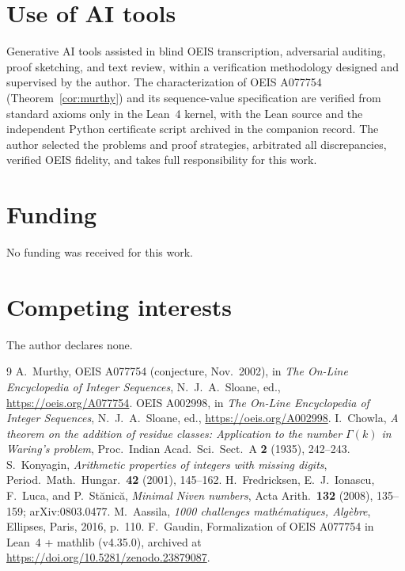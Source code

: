 \documentclass[11pt]{article}
\theoremstyle{remark}
\begin{document}
\section*{Use of AI tools}
Generative AI tools assisted in blind OEIS transcription,
adversarial auditing, proof sketching, and text review,
within a verification methodology designed and supervised
by the author. The characterization of OEIS A077754
(Theorem~\ref{cor:murthy}) and its sequence-value
specification are verified from standard axioms only in
the Lean~4 kernel, with the Lean source and the
independent Python certificate script archived in the
companion record. The author selected the problems and
proof strategies, arbitrated all discrepancies, verified
OEIS fidelity, and takes full responsibility for this
work.

\section*{Funding}
No funding was received for this work.

\section*{Competing interests}
The author declares none.

\begin{thebibliography}{9}
 A.~Murthy, OEIS A077754 (conjecture,
 Nov.~2002), in \emph{The On-Line Encyclopedia of Integer
 Sequences}, N.~J.~A.~Sloane, ed., \url{https://oeis.org/A077754}.
 OEIS A002998, in \emph{The On-Line
 Encyclopedia of Integer Sequences}, N.~J.~A.~Sloane,
 ed., \url{https://oeis.org/A002998}.
 I.~Chowla, \emph{A theorem on the addition
 of residue classes: Application to the number $\Gamma(k)$ in
 Waring's problem}, Proc.\ Indian Acad.\ Sci.\ Sect.~A
 \textbf{2} (1935), 242--243.
 S.~Konyagin, \emph{Arithmetic properties
 of integers with missing digits}, Period.\ Math.\ Hungar.\
 \textbf{42} (2001), 145--162.
 H.~Fredricksen, E.~J.~Ionascu, F.~Luca, and
 P.~St\u{a}nic\u{a}, \emph{Minimal Niven numbers}, Acta Arith.\
 \textbf{132} (2008), 135--159; arXiv:0803.0477.
\bibitem{aassila} M.~Aassila, \emph{1000 challenges
 math\'ematiques, Alg\`ebre}, Ellipses, Paris, 2016, p.~110.
\bibitem{lean} F.~Gaudin, Formalization of OEIS A077754 in
 Lean~4 + mathlib (v4.35.0), archived at
 \url{https://doi.org/10.5281/zenodo.23879087}.
\end{thebibliography}
\end{document}
